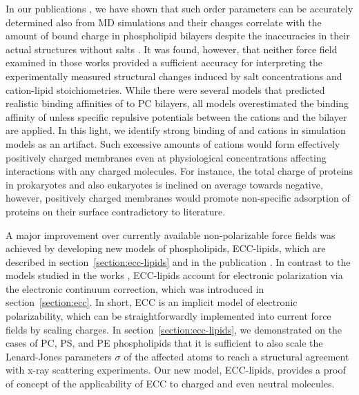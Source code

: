 In our publications \citep{catte16, nmrlipids_proj4},
we have shown that such order parameters can be accurately determined also from MD simulations
and their changes correlate with the amount of bound charge in phospholipid bilayers
despite the inaccuracies in their actual structures without salts \citep{botan15}. 
It was found, however, that
neither force field examined in those works 
provided a sufficient accuracy for interpreting 
the experimentally measured structural changes induced by salt concentrations
and cation-lipid stoichiometries. 
While there were several models
that predicted realistic binding affinities of  to PC bilayers,
all models overestimated the binding affinity of 
unless specific repulsive potentials between the cations and the bilayer are applied. \citep{catte16, nmrlipids_proj4}
In this light,
we identify strong binding of  and  cations
in simulation models as an artifact.  
Such excessive amounts of cations 
would form effectively positively charged membranes
even at physiological concentrations
affecting interactions with any charged molecules. 
For instance,
the total charge of proteins
in prokaryotes and also eukaryotes 
is inclined on average towards negative,
\citep{link1997identifying, link1997comparing, urquhart1998comparison, schwartz2001whole, knight2004global}
however,
positively charged membranes would promote non-specific adsorption of proteins on their surface 
contradictory to literature.  
\citep{junkova2016, lingwood2010lipid, sekerevs2015song} 


A major improvement over currently available non-polarizable force fields
was achieved by developing new models of phospholipids, 
ECC-lipids,
which are described in section~\ref{section:ecc-lipids}
and in the publication \citep{melcr18}. 
In contrast to the models studied in the works \citep{catte16, nmrlipids_proj4},
ECC-lipids account for electronic polarization
via the electronic continuum correction,  
which was introduced in section~\ref{section:ecc}. 
In short, 
ECC is an implicit model of electronic polarizability,
which can be straightforwardly implemented into current force fields 
by scaling charges.  
In section~\ref{section:ecc-lipids},
we demonstrated on the cases of PC, PS, and PE phospholipids
that it is sufficient to also scale the Lenard-Jones parameters $\sigma$ of the affected atoms
to reach a structural agreement with x-ray scattering experiments. 
Our new model, ECC-lipids,
provides a proof of concept of the applicability of ECC
to charged and even neutral molecules. 



